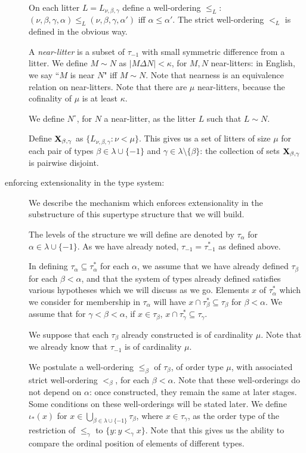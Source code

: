 \documentclass[112pt]{article}
\begin{document}
\begin{description}
On each litter $L =  L_{\nu,\beta,\gamma}$ define a well-ordering $\leq_L$:  $(\nu,\beta,\gamma,\alpha) \leq_L (\nu,\beta,\gamma,\alpha')$  iff $\alpha\leq \alpha'$.
The strict well-ordering $<_L$ is defined in the obvious way.

A {\em near-litter\/} is a subset of $\tau_{-1}$ with small symmetric difference from a litter.  We define $M \sim N$ as $|M \Delta N|<\kappa$, for $M,N$ near-litters:  in English, we say ``$M$ is near $N$" iff $M \sim N$.  Note that nearness is an equivalence relation on near-litters.  Note that there are $\mu$ near-litters, because the cofinality of $\mu$ is at least $\kappa$.

We define $N^\circ$, for $N$ a near-litter, as the litter $L$ such that $L \sim N$.  

Define ${\bf X}_{\beta,\gamma}$ as $\{L_{\nu,\beta,\gamma}:\nu < \mu\}$.  This gives us a set of litters of size $\mu$ for each pair of
types $\beta\in \lambda \cup \{-1\}$ and $\gamma \in \lambda \setminus \{\beta\}$:  the collection of sets ${\bf X}_{\beta,\gamma}$ is pairwise disjoint.  

\item[enforcing extensionality in the type system:]  We describe the mechanism which enforces extensionality in the substructure of this supertype structure that we will build.

The levels of the structure we will define are denoted by $\tau_\alpha$ for $\alpha \in \lambda \cup \{-1\}$.  As we have already noted, $\tau_{-1}=\tau^*_{-1}$ as defined above.

In defining $\tau_\alpha \subseteq \tau^*_\alpha$ for each $\alpha$, we assume that we have already defined $\tau_\beta$ for each $\beta<\alpha$, and that the system of types already defined satisfies various hypotheses which we will discuss as we go.
Elements $x$ of $\tau^*_\alpha$ which we consider for membership in $\tau_\alpha$ will have $x \cap \tau^*_\beta \subseteq \tau_\beta$ for $\beta<\alpha$.  We assume that for $\gamma<\beta<\alpha$, if $x \in \tau_\beta$, $x \cap \tau^*_\gamma \subseteq \tau_\gamma$.

We suppose that each $\tau_\beta$ already constructed is of cardinality $\mu$.  Note that we already know that
$\tau_{-1}$ is of cardinality $\mu$.

We postulate a well-ordering $\leq_\beta$ of $\tau_\beta$, of order type $\mu$, with associated strict well-ordering $<_\beta$, for each $\beta<\alpha$.   Note that these well-orderings do not depend on $\alpha$:  once constructed, they remain the same at later stages.  Some conditions on these well-orderings will be stated later.  We define $\iota_*(x)$ for $x \in \bigcup_{\beta \in \lambda \cup \{-1\}}\tau_\beta$, where $x \in \tau_\gamma$, as the order type of the restriction of $\leq_\gamma$ to
$\{y:y <_\gamma x\}$.  Note that this gives us the ability to compare the ordinal position of elements of different types.


\end{description}
\end{document}
